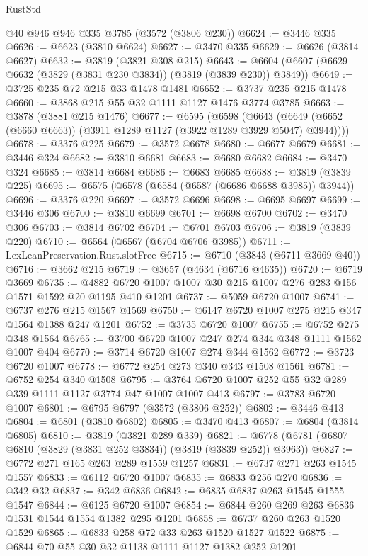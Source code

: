 \begin{lexlean}{RustStd}
\begin{coremodule}
    @40
    @946
    @946
    @335
    @3785
    (@3572 (@3806 @230))
@6624 := @3446 @335
@6626 := @6623 (@3810 @6624)
@6627 := @3470 @335
@6629 := @6626 (@3814 @6627)
@6632 := @3819 (@3821 @308 @215)
@6643 := @6604 (@6607 (@6629 @6632 (@3829 (@3831 @230 @3834)) (@3819 (@3839 @230)) @3849))
@6649 := @3725 @235 @72 @215 @33 @1478 @1481
@6652 := @3737 @235 @215 @1478
@6660 := @3868 @215 @55 @32 @1111 @1127 @1476 @3774 @3785
@6663 := @3878 (@3881 @215 @1476)
@6677 := @6595
    (@6598
      (@6643 (@6649 (@6652 (@6660 @6663)) (@3911 @1289 @1127 (@3922 @1289 @3929 @5047) @3944))))
@6678 := @3376 @225
@6679 := @3572 @6678
@6680 := @6677 @6679
@6681 := @3446 @324
@6682 := @3810 @6681
@6683 := @6680 @6682
@6684 := @3470 @324
@6685 := @3814 @6684
@6686 := @6683 @6685
@6688 := @3819 (@3839 @225)
@6695 := @6575 (@6578 (@6584 (@6587 (@6686 @6688 @3985)) @3944))
@6696 := @3376 @220
@6697 := @3572 @6696
@6698 := @6695 @6697
@6699 := @3446 @306
@6700 := @3810 @6699
@6701 := @6698 @6700
@6702 := @3470 @306
@6703 := @3814 @6702
@6704 := @6701 @6703
@6706 := @3819 (@3839 @220)
@6710 := @6564 (@6567 (@6704 @6706 @3985))
@6711 := LexLeanPreservation.Rust.slotFree
@6715 := @6710 (@3843 (@6711 @3669 @40))
@6716 := @3662 @215
@6719 := @3657 (@4634 (@6716 @4635))
@6720 := @6719 @3669
@6735 := @4882 @6720 @1007 @1007 @30 @215 @1007 @276 @283 @156 @1571 @1592 @20 @1195 @410 @1201
@6737 := @5059 @6720 @1007
@6741 := @6737 @276 @215 @1567 @1569
@6750 := @6147 @6720 @1007 @275 @215 @347 @1564 @1388 @247 @1201
@6752 := @3735 @6720 @1007
@6755 := @6752 @275 @348 @1564
@6765 := @3700 @6720 @1007 @247 @274 @344 @348 @1111 @1562 @1007 @404
@6770 := @3714 @6720 @1007 @274 @344 @1562
@6772 := @3723 @6720 @1007
@6778 := @6772 @254 @273 @340 @343 @1508 @1561
@6781 := @6752 @254 @340 @1508
@6795 := @3764 @6720 @1007 @252 @55 @32 @289 @339 @1111 @1127 @3774 @47 @1007 @1007 @413
@6797 := @3783 @6720 @1007
@6801 := @6795 @6797 (@3572 (@3806 @252))
@6802 := @3446 @413
@6804 := @6801 (@3810 @6802)
@6805 := @3470 @413
@6807 := @6804 (@3814 @6805)
@6810 := @3819 (@3821 @289 @339)
@6821 := @6778 (@6781 (@6807 @6810 (@3829 (@3831 @252 @3834)) (@3819 (@3839 @252)) @3963))
@6827 := @6772 @271 @165 @263 @289 @1559 @1257
@6831 := @6737 @271 @263 @1545 @1557
@6833 := @6112 @6720 @1007
@6835 := @6833 @256 @270
@6836 := @342 @32
@6837 := @342 @6836
@6842 := @6835 @6837 @263 @1545 @1555 @1547
@6844 := @6125 @6720 @1007
@6854 := @6844 @260 @269 @263 @6836 @1531 @1544 @1554 @1382 @295 @1201
@6858 := @6737 @260 @263 @1520 @1529
@6865 := @6833 @258 @72 @33 @263 @1520 @1527 @1522
@6875 := @6844 @70 @55 @30 @32 @1138 @1111 @1127 @1382 @252 @1201

\end{coremodule}
\end{lexlean}
